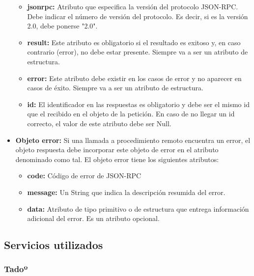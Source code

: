 \documentclass[spanish,12pt, a4paper, twoside]{paper}
\begin{document}
\begin{itemize}
\begin{itemize}
\item \textbf{jsonrpc:} Atributo que especifica la versión del protocolo JSON-RPC. Debe indicar el número de versión del protocolo. Es decir, si es la versión 2.0, debe ponerse "2.0".

\item \textbf{result:} Este atributo es obligatorio si el resultado es exitoso y, en caso contrario (error), no debe estar presente. Siempre va a ser un atributo de estructura.

\item \textbf{error:} Este atributo debe existir en los casos de error y no aparecer en casos de éxito. Siempre va a ser un atributo de estructura.

\item \textbf{id:} El identificador en las respuestas es obligatorio y debe ser el mismo id que el recibido en el objeto de la petición. En caso de no llegar un id correcto, el valor de este atributo debe ser Null.
\end{itemize}

\item \textbf{Objeto error:} Si una llamada a procedimiento remoto encuentra un error, el objeto respuesta debe incorporar este objeto de error en el atributo denominado como tal. El objeto error tiene los siguientes atributos:

\begin{itemize}
\item \textbf{code:} Código de error de JSON-RPC

\item \textbf{message:} Un String que indica la descripción resumida del error.

\item \textbf{data:} Atributo de tipo primitivo o de estructura que entrega información adicional del error. Es un atributo opcional.
\end{itemize}

\end{itemize}

\subsection{Servicios utilizados}

\subsubsection{Tadoº}
\end{document}
